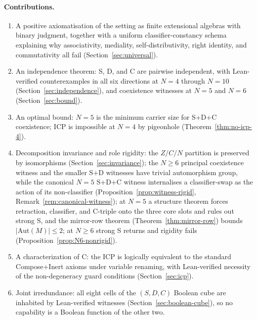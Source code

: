 \paragraph{Contributions.}
\begin{enumerate}
  \item A positive axiomatisation of the setting as finite extensional
    algebras with binary judgment, together with a uniform
    classifier-constancy schema explaining why associativity, mediality,
    self-distributivity, right identity, and commutativity all fail
    (Section~\ref{sec:universal}).
  \item An independence theorem: S, D, and C are pairwise independent,
    with Lean-verified counterexamples in all six directions at $N = 4$
    through $N = 10$ (Section~\ref{sec:independence}), and coexistence
    witnesses at $N = 5$ and $N = 6$ (Section~\ref{sec:bound}).
  \item An optimal bound: $N = 5$ is the minimum carrier size for S+D+C
    coexistence; ICP is impossible at $N = 4$ by pigeonhole
    (Theorem~\ref{thm:no-icp-4}).
  \item Decomposition invariance and role rigidity: the $Z/C/N$ partition
    is preserved by isomorphisms (Section~\ref{sec:invariance}); the
    $N \geq 6$ principal coexistence witness and the smaller S+D witnesses
    have trivial automorphism group, while the canonical $N = 5$ S+D+C
    witness internalises a classifier-swap as the action of its
    non-classifier (Proposition~\ref{prop:witness-rigid},
    Remark~\ref{rem:canonical-witness}); at $N = 5$ a structure theorem
    forces retraction, classifier, and C-triple onto the three core slots
    and rules out strong S, and the mirror-row theorem
    (Theorem~\ref{thm:mirror-row}) bounds $|\mathrm{Aut}(M)| \leq 2$;
    at $N \geq 6$ strong S returns and rigidity fails
    (Proposition~\ref{prop:N6-nonrigid}).
  \item A characterization of C: the ICP is logically equivalent to the
    standard Compose+Inert axioms under variable renaming, with
    Lean-verified necessity of the non-degeneracy guard conditions
    (Section~\ref{sec:icp}).
  \item Joint irredundance: all eight cells of the $(S, D, C)$ Boolean
    cube are inhabited by Lean-verified witnesses
    (Section~\ref{sec:boolean-cube}), so no capability is a Boolean
    function of the other two.
\end{enumerate}


